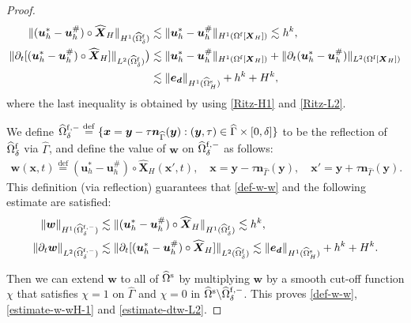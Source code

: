 \documentclass[11pt,reqno]{amsart}
\theoremstyle{definition}
\theoremstyle{plain}
\numberwithin{theorem}{section}
\numberwithin{proposition}{section}
\numberwithin{lemma}{section}
\numberwithin{equation}{section}
\newcommand{\bs}[1]{\boldsymbol{#1}}
\renewcommand{\(}{\bigl(}
\renewcommand{\)}{\bigr)}
\def\eqd{\stackrel{\mathrm{def}}{=}}
\begin{document}
\begin{proof}
\begin{align}
\|({\bs u}_h^*-{\bs u}_h^\#)\circ\widehat{\bs X}_H\|_{H^1(\widehat{\Omega}^{\rm f}_\delta)}
&\lesssim \|{\bs u}_h^*-{\bs u}_h^\#\|_{H^1(\Omega^{\rm f}[{\bs X}_H])} 
\lesssim h^k, \\
\|\partial_t[({\bs u}_h^*-{\bs u}_h^\#)\circ\widehat{\bs X}_H]\|_{L^2(\widehat{\Omega}^{\rm f}_\delta)}\big) 
&\lesssim \|{\bs u}_h^*-{\bs u}_h^\#\|_{H^1(\Omega^{\rm f}[{\bs X}_H])}
+ \|\partial_t({\bs u}_h^*-{\bs u}_h^\#)\|_{L^2(\Omega^{\rm f}[{\bs X}_H])} \notag\\
&\lesssim \|{\bs e}_{\bs d}\|_{H^1(\widehat\Omega^{\rm s}_H)}
+ h^k + H^k ,
\end{align} 
where the last inequality is obtained by using \eqref{Ritz-H1} and \eqref{Ritz-L2}. 

We define $\widehat{\Omega}^{\rm f,-}_\delta\eqd \{\bs x= \bs y-\tau{\bs n}_{\widehat\Gamma}(\bs y): (\bs y,\tau)\in\widehat\Gamma\times[0,\delta] \}$ to be the reflection of $\widehat{\Omega}^{\rm f}_\delta$ via $\widehat\Gamma$, and define the value of ${\bs w}$ on $\widehat{\Omega}^{\rm f,-}_\delta$ as follows: 
\begin{align}
{\bs w}(\bs x,t) 
\eqd ({\bs u}_h^*-{\bs u}_h^\#)\circ\widehat{\bs X}_H (\bs x',t) , 
\quad
\bs x= \bs y-\tau{\bs n}_{\widehat\Gamma}(\bs y),\quad \bs x'= \bs y+\tau{\bs n}_{\widehat\Gamma}(\bs y).
\end{align}
This definition (via reflection) guarantees that \eqref{def-w-w} and the following estimate are satisfied: 
\begin{align}
\|{\bs w}\|_{H^1(\widehat{\Omega}^{\rm f,-}_\delta)}
&\lesssim \|({\bs u}_h^*-{\bs u}_h^\#)\circ\widehat{\bs X}_H\|_{H^1(\widehat{\Omega}^{\rm f}_\delta)} 
\lesssim h^k , \\
\|\partial_t{\bs w}\|_{L^2(\widehat{\Omega}^{\rm f,-}_\delta)} 
&\lesssim \|\partial_t[({\bs u}_h^*-{\bs u}_h^\#)\circ\widehat{\bs X}_H]\|_{L^2(\widehat{\Omega}^{\rm f}_\delta)}
\lesssim \|{\bs e}_{\bs d}\|_{H^1(\widehat\Omega^{\rm s}_H)}
+ h^k + H^k .
\label{dtwL2Omegadelta}
\end{align}

Then we can extend ${\bs w}$ to all of $\widehat\Omega^{\rm s}$ by multiplying ${\bs w}$ by a smooth cut-off function $\chi$ that satisfies $\chi=1$ on $\widehat\Gamma$ and $\chi=0$ in $\widehat\Omega^{\rm s}\backslash\widehat{\Omega}^{\rm f,-}_\delta$. This proves \eqref{def-w-w}, \eqref{estimate-w-wH-1} and \eqref{estimate-dtw-L2}. 


\end{proof}
\end{document}
